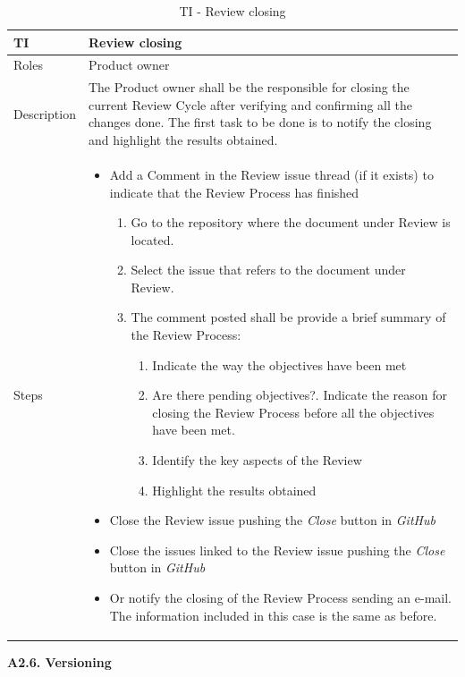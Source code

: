 \documentclass{template/openetcs_article}
\begin{document}
\begin{table}[H]
\begin{tabular}{|m{2cm}|m{12cm}|}
\hline
\rowcolor{myblue}
TI & 
Review closing
\\\hline
Roles &
Product owner
\\\hline
Description &
The Product owner shall be the responsible for closing the current Review Cycle after verifying and confirming all the changes done. The first task to be done is to notify the closing and highlight the results obtained.
\\\hline
Steps &
\begin{itemize}
\item Add a Comment in the Review issue thread (if it exists) to indicate that the Review Process has finished
\begin{enumerate}
\item Go to the repository where the document under Review is located.
\item Select the issue that refers to the document under Review.
\item The comment posted shall be provide a brief summary of the Review Process:
\begin{enumerate}
\item Indicate the way the objectives have been met 
\item Are there pending objectives?. Indicate the reason for closing the Review Process before all the objectives have been met.
\item Identify the key aspects of the Review
\item Highlight the results obtained
\end{enumerate}
\end{enumerate}
\item Close the Review issue pushing the {\it Close} button in {\it GitHub}
\item Close the issues linked to the Review issue pushing the {\it Close} button in {\it GitHub}
\item Or notify the closing of the Review Process sending an e-mail. The information included in this case is the same as before.
\end{itemize}
\\\hline
\end{tabular}
\caption{TI - Review closing}
\end{table}

\textbf{A2.6. Versioning}
\end{document}
